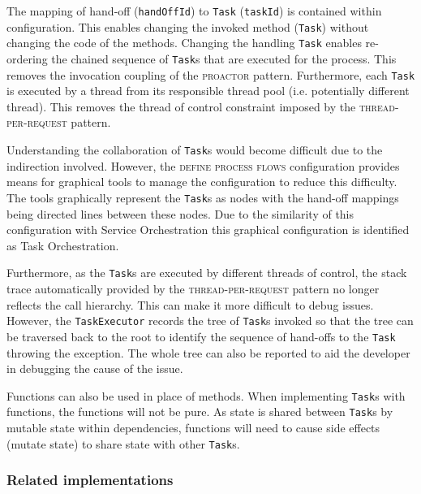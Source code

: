 \documentclass[prodmode]{style/acmlarge}
\begin{document}
The mapping of hand-off (\texttt{handOffId}) to \texttt{Task} (\texttt{taskId})
is contained within configuration.  This enables changing the invoked method
(\texttt{Task}) without changing the code of the methods.  Changing the handling
\texttt{Task} enables re-ordering the chained sequence of \texttt{Task}s that
are executed for the process.  This removes the invocation coupling of the
\textsc{proactor} pattern.  Furthermore, each \texttt{Task} is executed by a
thread from its responsible thread pool (i.e. potentially different thread). 
This removes the thread of control constraint imposed by the
\textsc{thread-per-request} pattern.

Understanding the collaboration of \texttt{Task}s would become difficult due to
the indirection involved.  However, the \textsc{define process flows}
configuration provides means for graphical tools to manage the configuration to
reduce this difficulty.  The tools graphically represent the \texttt{Task}s as
nodes with the hand-off mappings being directed lines between these nodes.  Due
to the similarity of this configuration with Service Orchestration this
graphical configuration is identified as Task Orchestration.

Furthermore, as the \texttt{Task}s are executed by different threads of control,
the stack trace automatically provided by the \textsc{thread-per-request}
pattern no longer reflects the call hierarchy.  This can make it more difficult
to debug issues.  However, the \texttt{TaskExecutor} records the tree of
\texttt{Task}s invoked so that the tree can be traversed back to the root to
identify the sequence of hand-offs to the \texttt{Task} throwing the exception. 
The whole tree can also be reported to aid the developer in debugging the cause
of the issue.

Functions can also be used in place of methods.  When implementing
\texttt{Task}s with functions, the functions will not be pure.  As state is
shared between \texttt{Task}s by mutable state within dependencies, functions
will need to cause side effects (mutate state) to share state with other
\texttt{Task}s.



\subsubsection*{Related implementations}
\end{document}
